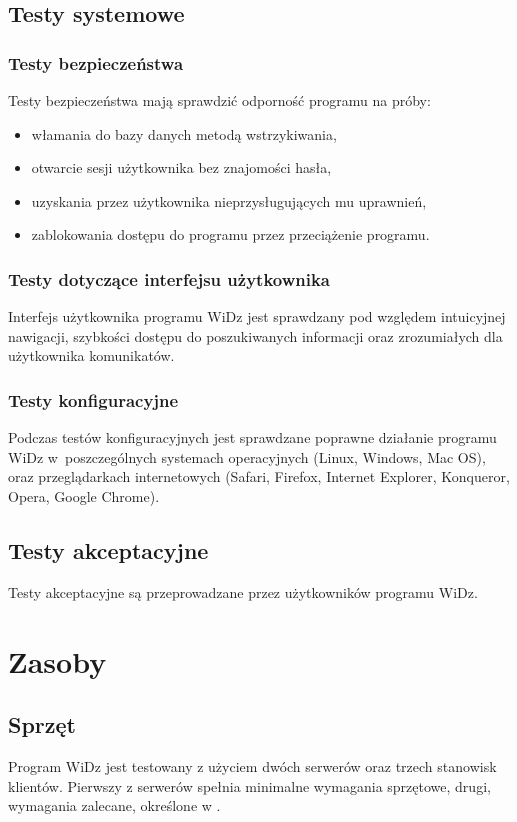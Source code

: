 \documentclass[12pt,leqno,twoside]{mwart}
\begin{document}
\subsection{Testy systemowe}
\subsubsection{Testy bezpieczeństwa}
\noindent Testy bezpieczeństwa mają sprawdzić odporność programu na próby:
\begin{itemize}
	\item włamania do bazy danych metodą wstrzykiwania,
	\item otwarcie sesji użytkownika bez znajomości hasła,
	\item uzyskania przez użytkownika nieprzysługujących mu uprawnień,
	\item zablokowania dostępu do programu przez przeciążenie programu.
\end{itemize}
\subsubsection{Testy dotyczące interfejsu użytkownika}
\noindent Interfejs użytkownika programu WiDz jest sprawdzany pod względem intuicyjnej nawigacji, szybkości dostępu do poszukiwanych informacji oraz zrozumiałych dla użytkownika komunikatów. \\
\subsubsection{Testy konfiguracyjne}
\noindent Podczas testów konfiguracyjnych jest sprawdzane poprawne działanie programu WiDz w~poszczególnych systemach operacyjnych (Linux, Windows, Mac OS), oraz przeglądarkach internetowych (Safari, Firefox, Internet Explorer, Konqueror, Opera, Google Chrome).\\
\subsection{Testy akceptacyjne}
\noindent Testy akceptacyjne są przeprowadzane przez użytkowników programu WiDz. \\
\section{Zasoby}
\subsection{Sprzęt}
\noindent Program WiDz jest testowany z użyciem dwóch serwerów oraz trzech stanowisk klientów. Pierwszy z serwerów spełnia minimalne wymagania sprzętowe, drugi, wymagania zalecane, określone w \cite{WYM}.
\end{document}
